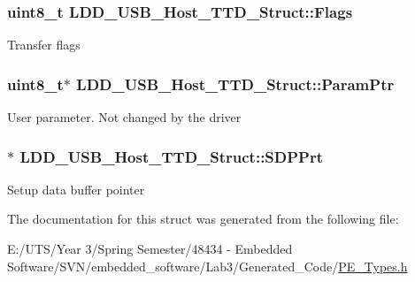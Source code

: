 \subsubsection[{Flags}]{\setlength{\rightskip}{0pt plus 5cm}uint8\+\_\+t L\+D\+D\+\_\+\+U\+S\+B\+\_\+\+Host\+\_\+\+T\+T\+D\+\_\+\+Struct\+::\+Flags}\label{struct_l_d_d___u_s_b___host___t_t_d___struct_a083f54cb9e59a2206aca7d5481154c27}
Transfer flags \hypertarget{struct_l_d_d___u_s_b___host___t_t_d___struct_ab6fd6fdfe1e3e43cbdb5e1f2f61b3265}{}
\subsubsection[{Param\+Ptr}]{\setlength{\rightskip}{0pt plus 5cm}uint8\+\_\+t$\ast$ L\+D\+D\+\_\+\+U\+S\+B\+\_\+\+Host\+\_\+\+T\+T\+D\+\_\+\+Struct\+::\+Param\+Ptr}\label{struct_l_d_d___u_s_b___host___t_t_d___struct_ab6fd6fdfe1e3e43cbdb5e1f2f61b3265}
User parameter. Not changed by the driver \hypertarget{struct_l_d_d___u_s_b___host___t_t_d___struct_af1881ea197419558fdb55dc5f98ee446}{}
\subsubsection[{S\+D\+P\+Prt}]{$\ast$ L\+D\+D\+\_\+\+U\+S\+B\+\_\+\+Host\+\_\+\+T\+T\+D\+\_\+\+Struct\+::\+S\+D\+P\+Prt}\label{struct_l_d_d___u_s_b___host___t_t_d___struct_af1881ea197419558fdb55dc5f98ee446}
Setup data buffer pointer 

The documentation for this struct was generated from the following file\+:\begin{DoxyCompactItemize}
\item 
E\+:/\+U\+T\+S/\+Year 3/\+Spring Semester/48434 -\/ Embedded Software/\+S\+V\+N/embedded\+\_\+software/\+Lab3/\+Generated\+\_\+\+Code/\hyperlink{_p_e___types_8h}{P\+E\+\_\+\+Types.\+h}\end{DoxyCompactItemize}
